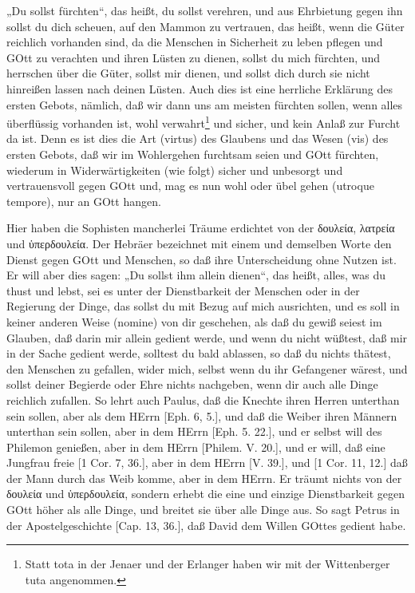 „Du sollst fürchten“, das heißt, du sollst verehren, und aus Ehrbietung gegen ihn sollst du dich scheuen, auf den Mammon zu vertrauen, das heißt, wenn die Güter reichlich vorhanden sind, da die Menschen in Sicherheit zu leben pflegen und GOtt zu verachten und ihren Lüsten zu dienen, sollst du mich fürchten, und herrschen über die Güter, sollst mir dienen, und sollst dich durch sie nicht hinreißen lassen nach deinen Lüsten. Auch dies ist eine herrliche Erklärung des ersten Gebots, nämlich, daß wir dann uns am meisten fürchten sollen, wenn alles überflüssig vorhanden ist, wohl verwahrt\footnote{Statt tota in der Jenaer und der Erlanger haben wir mit der Wittenberger tuta angenommen.} und sicher, und kein Anlaß zur Furcht da ist. Denn es ist dies die Art (virtus) des Glaubens und das Wesen (vis) des ersten Gebots, daß wir im Wohlergehen furchtsam seien und GOtt fürchten, wiederum in Widerwärtigkeiten (wie folgt) sicher und unbesorgt und vertrauensvoll gegen GOtt und, mag es nun wohl oder übel gehen (utroque tempore), nur an GOtt hangen.

Hier haben die Sophisten mancherlei Träume erdichtet von der δουλεία, λατρεία und ὑπερδουλεία. Der Hebräer bezeichnet mit einem und demselben Worte den Dienst gegen GOtt und Menschen, so daß ihre Unterscheidung ohne Nutzen ist. Er will aber dies sagen: „Du sollst ihm allein dienen“, das heißt, alles, was du thust und lebst, sei es unter der Dienstbarkeit der Menschen oder in der Regierung der Dinge, das sollst du mit Bezug auf mich ausrichten, und es soll in keiner anderen Weise (nomine) von dir geschehen, als daß du gewiß seiest im Glauben, daß darin mir allein gedient werde, und wenn du nicht wüßtest, daß mir in der Sache gedient werde, solltest du bald ablassen, so daß du nichts thätest, den Menschen zu gefallen, wider mich, selbst wenn du ihr Gefangener wärest, und sollst deiner Begierde oder Ehre nichts nachgeben, wenn dir auch alle Dinge reichlich zufallen. So lehrt auch Paulus, daß die
Knechte ihren Herren unterthan sein sollen, aber als dem HErrn [Eph. 6, 5.], und daß die Weiber ihren Männern unterthan sein sollen, aber in dem HErrn [Eph. 5. 22.], und er selbst will des Philemon genießen, aber in dem HErrn [Philem. V. 20.], und er will, daß eine Jungfrau freie [1 Cor. 7, 36.], aber in dem HErrn [V. 39.], und [1 Cor. 11, 12.] daß der Mann durch das Weib komme, aber in dem HErrn. Er träumt nichts von der δουλεία und ὑπερδουλεία, sondern erhebt die eine und einzige Dienstbarkeit gegen GOtt höher als alle Dinge, und breitet sie über alle Dinge aus. So sagt Petrus in der Apostelgeschichte [Cap. 13, 36.], daß David dem Willen GOttes gedient habe.

